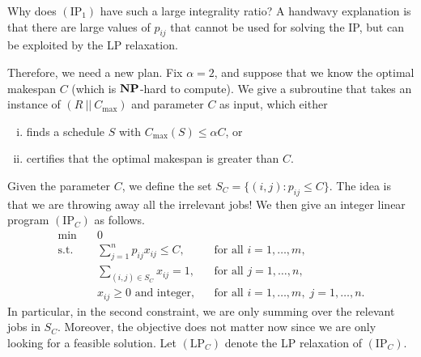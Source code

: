 Why does $(\text{IP}_1)$ have such a large integrality ratio? A handwavy 
explanation is that there are large values of $p_{ij}$ that cannot be 
used for solving the IP, but can be exploited by the LP relaxation. 

Therefore, we need a new plan. Fix $\alpha = 2$, and suppose that we 
know the optimal makespan $C$ (which is $\operatorname{\textbf{NP}}$-hard to compute). 
We give a subroutine that takes an instance of $(R~||~C_{\max})$ 
and parameter $C$ as input, which either 
\begin{enumerate}[(i)]
    \item finds a schedule $S$ with $C_{\max}(S) \leq \alpha C$, or 
    \item certifies that the optimal makespan is greater than $C$. 
\end{enumerate}
Given the parameter $C$, we define the set $S_C = \{(i, j) : p_{ij} \leq C\}$.
The idea is that we are throwing away all the irrelevant jobs! We then 
give an integer linear program $(\text{IP}_C)$ as follows.
\begin{align*}
    \min\quad & 0 \\ 
    \text{s.t.}\quad & \sum_{j=1}^n p_{ij} x_{ij} \leq C, && \text{for all } i = 1, \dots, m, \\ 
    & \sum_{(i, j) \in S_C} x_{ij} = 1, && \text{for all } j = 1, \dots, n, \\ 
    & x_{ij} \geq 0 \text{ and integer}, && \text{for all } i = 1, \dots, m,\; j = 1, \dots, n. 
\end{align*}
In particular, in the second constraint, we are only summing over the 
relevant jobs in $S_C$. Moreover, the objective does not matter now 
since we are only looking for a feasible solution. Let $(\text{LP}_C)$ denote 
the LP relaxation of $(\text{IP}_C)$.

